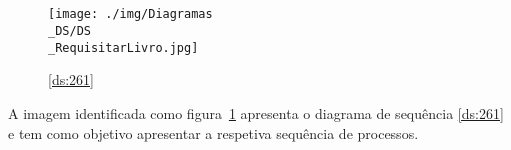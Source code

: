 \subsection{}

\begin{figure}[H]
	\centering
	\texttt{[image: ./img/Diagramas\\\_DS/DS\\\_RequisitarLivro.jpg]}  %
	\caption{\ref{ds:261}}
	\label{fig:chap261}
\end{figure}

\par A imagem identificada como figura~\ref{fig:chap261} apresenta o diagrama de sequência \ref{ds:261} e tem como objetivo apresentar a respetiva sequência de processos.